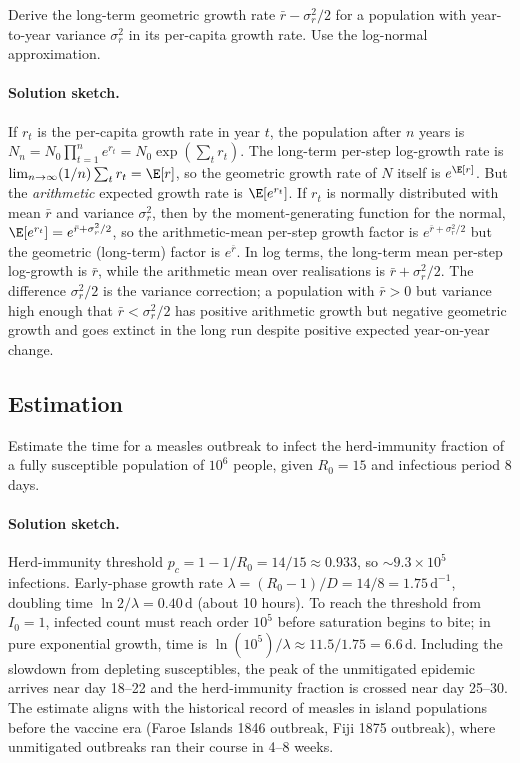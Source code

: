 \begin{exercise}
Derive the long-term geometric growth rate $\bar r - \sigma_r^2/2$
for a population with year-to-year variance $\sigma_r^2$ in its
per-capita growth rate. Use the log-normal approximation.

\paragraph{Solution sketch.} If $r_t$ is the per-capita growth rate
in year $t$, the population after $n$ years is
$N_n = N_0 \prod_{t=1}^{n} e^{r_t} = N_0 \exp\left(\sum_t
r_t\right)$. The long-term per-step log-growth rate is
$\lim_{n \to \infty} (1/n) \sum_t r_t = \E[r]$, so the geometric
growth rate of $N$ itself is $e^{\E[r]}$. But the \emph{arithmetic}
expected growth rate is $\E[e^{r_t}]$. If $r_t$ is normally
distributed with mean $\bar r$ and variance $\sigma_r^2$, then by
the moment-generating function for the normal,
$\E[e^{r_t}] = e^{\bar r + \sigma_r^2/2}$, so the arithmetic-mean
per-step growth factor is $e^{\bar r + \sigma_r^2/2}$ but the
geometric (long-term) factor is $e^{\bar r}$. In log terms, the
long-term mean per-step log-growth is $\bar r$, while the
arithmetic mean over realisations is $\bar r + \sigma_r^2/2$. The
difference $\sigma_r^2/2$ is the variance correction; a population
with $\bar r > 0$ but variance high enough that $\bar r <
\sigma_r^2/2$ has positive arithmetic growth but negative geometric
growth and goes extinct in the long run despite positive expected
year-on-year change.
\end{exercise}

\subsection*{Estimation}

\begin{exercise}
Estimate the time for a measles outbreak to infect the
herd-immunity fraction of a fully susceptible population of
$10^6$ people, given $R_0 = 15$ and infectious period 8 days.

\paragraph{Solution sketch.} Herd-immunity threshold
$p_c = 1 - 1/R_0 = 14/15 \approx 0.933$, so $\sim 9.3 \times 10^5$
infections. Early-phase growth rate $\lambda = (R_0 - 1)/D =
14/8 = 1.75\,\text{d}^{-1}$, doubling time $\ln 2/\lambda =
0.40\,\text{d}$ (about 10 hours). To reach the threshold from
$I_0 = 1$, infected count must reach order $10^5$ before
saturation begins to bite; in pure exponential growth, time is
$\ln(10^5)/\lambda \approx 11.5/1.75 = 6.6\,\text{d}$. Including
the slowdown from depleting susceptibles, the peak of the
unmitigated epidemic arrives near day 18--22 and the herd-immunity
fraction is crossed near day 25--30. The estimate aligns with the
historical record of measles in island populations before the
vaccine era (Faroe Islands 1846 outbreak, Fiji 1875 outbreak),
where unmitigated outbreaks ran their course in 4--8 weeks.
\end{exercise}

